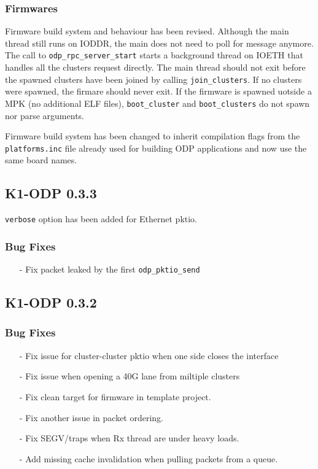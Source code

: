 \documentclass{trkalray}
\begin{document}
\subsubsection{Firmwares}

Firmware build system and behaviour has been revised.
Although the main thread still runs on IODDR, the main does not need
to poll for message anymore.
The call to \texttt{odp\_rpc\_server\_start} starts a background
thread on IOETH that handles all the clusters request directly.
The main thread should not exit before the spawned clusters have been
joined by calling \texttt{join\_clusters}.
If no clusters were spawned, the firmare should never exit.
If the firmware is spawned uotside a MPK (no additional ELF files),
\texttt{boot\_cluster} and \texttt{boot\_clusters} do not spawn nor
parse arguments.

Firmware build system has been changed to inherit compilation flags
from the \texttt{platforms.inc} file already used for building ODP
applications and now use the same board names.

\subsection{K1-ODP 0.3.3}

\texttt{verbose} option has been added for Ethernet pktio.

\subsubsection{Bug Fixes}
\begin{itemize}
\item[-]{Fix packet leaked by the first \texttt{odp\_pktio\_send}}
\end{itemize}

\subsection{K1-ODP 0.3.2}
\subsubsection{Bug Fixes}
\begin{itemize}
\item[-]{Fix issue for cluster-cluster pktio when one side closes the
  interface}
\item[-]{Fix issue when opening a 40G lane from miltiple clusters}
\item[-]{Fix clean target for firmware in template project.}
\item[-]{Fix another issue in packet ordering.}
\item[-]{Fix SEGV/traps when Rx thread are under heavy loads.}
\item[-]{Add missing cache invalidation when pulling packets from a queue.}
\end{itemize}
\end{document}
